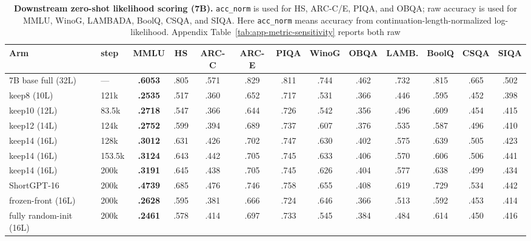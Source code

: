 \begin{table}[t]
\centering
\scriptsize
\setlength{\tabcolsep}{2.2pt}
\begin{tabular}{@{}llccccccccccc@{}}
\toprule
\textbf{Arm} & \textbf{step} & \textbf{MMLU} & \textbf{HS} &
\textbf{ARC-C} & \textbf{ARC-E} & \textbf{PIQA} & \textbf{WinoG} &
\textbf{OBQA} & \textbf{LAMB.} & \textbf{BoolQ} & \textbf{CSQA} &
\textbf{SIQA} \\
\midrule
7B base full (32L)       & ---    & \textbf{.6053} & .805 & .571 & .829 & .811 & .744 & .462 & .732 & .815 & .665 & .502 \\
keep8 (10L)              & 121k   & \textbf{.2535} & .517 & .360 & .652 & .717 & .531 & .366 & .446 & .595 & .452 & .398 \\
keep10 (12L)             & 83.5k  & \textbf{.2718} & .547 & .366 & .644 & .726 & .542 & .356 & .496 & .609 & .454 & .415 \\
keep12 (14L)             & 124k   & \textbf{.2752} & .599 & .394 & .689 & .737 & .607 & .376 & .535 & .587 & .496 & .410 \\
keep14 (16L)             & 128k   & \textbf{.3012} & .631 & .426 & .702 & .747 & .630 & .402 & .575 & .639 & .505 & .423 \\
keep14 (16L)             & 153.5k & \textbf{.3124} & .643 & .442 & .705 & .745 & .633 & .406 & .570 & .606 & .506 & .441 \\
keep14 (16L)             & 200k   & \textbf{.3191} & .645 & .438 & .705 & .745 & .626 & .404 & .577 & .638 & .499 & .434 \\
ShortGPT-16              & 200k   & \textbf{.4739} & .685 & .476 & .746 & .758 & .655 & .408 & .619 & .729 & .534 & .442 \\
frozen-front (16L)       & 200k   & \textbf{.2628} & .595 & .381 & .666 & .724 & .646 & .366 & .513 & .592 & .453 & .414 \\
fully random-init (16L)  & 200k   & \textbf{.2461} & .578 & .414 & .697 & .733 & .545 & .384 & .484 & .614 & .450 & .416 \\
\bottomrule
\end{tabular}
\caption{\textbf{Downstream zero-shot likelihood scoring (7B).}
\texttt{acc\_norm} is used for HS, ARC-C/E, PIQA, and OBQA; raw accuracy is
used for MMLU, WinoG, LAMBADA, BoolQ, CSQA, and SIQA. Here \texttt{acc\_norm} means accuracy from continuation-length-normalized
log-likelihood. Appendix Table~\ref{tab:app-metric-sensitivity} reports both raw
}
\end{table}
